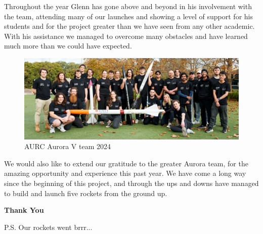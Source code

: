 Throughout the year Glenn has gone above and beyond in his involvement with the team, attending many of our launches and showing a level of support for his students and for the project greater than we have seen from any other academic. With his assistance we managed to overcome many obstacles and have learned much more than we could have expected.

\begin{figure}[h]
    \begin{center}
        \includegraphics[width=\textwidth]{./img/aurora_team.jpg}
    \end{center}
    \caption{AURC Aurora V team 2024}\label{fig:aurora_team}
\end{figure}

We would also like to extend our gratitude to the greater Aurora team, for the amazing opportunity and experience this past year. We have come a long way since the beginning of this project, and through the ups and downs have managed to build and launch five rockets from the ground up. 

\hfill{}\textbf{Thank You}\hfill{}

\vfill{}\hfill{}P.S. Our rockets went brrr...
